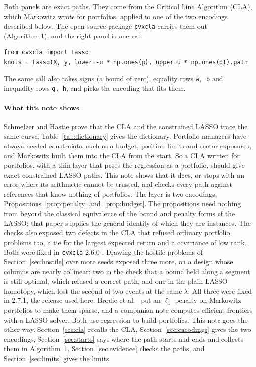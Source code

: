 \documentclass[11pt]{article}
\theoremstyle{remark}
\begin{document}
Both panels are exact paths. They come from the Critical Line Algorithm (CLA), which
Markowitz \cite{markowitz1956} wrote for portfolios, applied to one of the two encodings
described below. The open-source package \texttt{cvxcla} \cite{cvxcla} carries them out
(Algorithm~1), and the right panel is one call:
\begin{lstlisting}
from cvxcla import Lasso
knots = Lasso(X, y, lower=-u * np.ones(p), upper=u * np.ones(p)).path
\end{lstlisting}
The same call also takes signs (a bound of zero), equality rows \texttt{a, b} and
inequality rows \texttt{g, h}, and picks the encoding that fits them.

\paragraph{What this note shows} Schmelzer and Hastie \cite{perspective} prove that
the CLA and the constrained LASSO \cite{james2020,gaines2018} trace the same curve;
Table~\ref{tab:dictionary} gives the dictionary. Portfolio managers have always needed
constraints, such as a budget, position limits and sector exposures, and Markowitz built
them into the CLA from the start. So a CLA written for portfolios, with a thin layer
that poses the regression as a portfolio, should give exact constrained-LASSO paths.
This note shows that it does, or stops with an error where its arithmetic cannot be
trusted, and checks every path against references that know nothing of portfolios.
The layer is two encodings, Propositions~\ref{prop:penalty} and~\ref{prop:budget}. The propositions need nothing from
\cite{perspective} beyond the classical equivalence of the bound and penalty forms of
the LASSO; that paper supplies the general identity of which they are instances. The
checks also exposed two defects in the CLA that refused ordinary portfolio problems too,
a tie for the largest expected return and a covariance of low rank. Both were fixed in
\texttt{cvxcla} 2.6.0 \cite{cvxcla}. Drawing the hostile problems of
Section~\ref{sec:hostile} over more seeds exposed three more, on a design whose columns
are nearly collinear: two in the check that a bound held along a segment is still
optimal, which refused a correct path, and one in the plain LASSO homotopy, which lost
the second of two events at the same $\lambda$. All three were fixed in 2.7.1, the
release used here. Brodie et al.\ \cite{brodie2009} put an
$\ell_1$ penalty on Markowitz portfolios to make them sparse, and a companion note
\cite{lassonote} computes efficient frontiers with a LASSO solver. Both use regression
to build portfolios. This note goes the other way. Section~\ref{sec:cla} recalls the
CLA, Section~\ref{sec:encodings} gives the two encodings, Section~\ref{sec:starts} says
where the path starts and ends and collects them in Algorithm~1,
Section~\ref{sec:evidence} checks the paths, and Section~\ref{sec:limits} gives the
limits.
\end{document}

